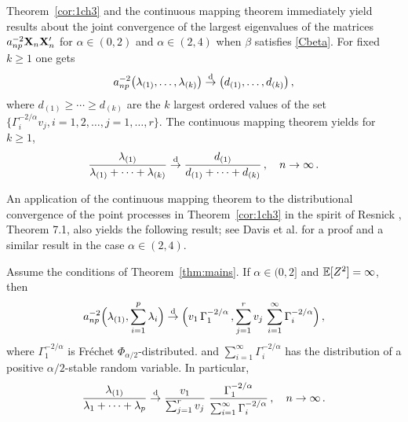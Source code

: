 \par
Theorem~\ref{cor:1ch3} and the continuous mapping theorem immediately yield results about
the joint convergence of the largest eigenvalues of the matrices $a_{np}^{-2}{\mathbf X}_n{\mathbf X}_n'$ for $\alpha\in (0,2)$ and
$\alpha\in (2,4)$ when $\beta$ satisfies \ref{Cbeta}.
For fixed $k\ge 1$ one gets
\begin{equation*}
a_{np}^{-2} \big(\lambda_{(1)},\ldots,\lambda_{(k)}\big)\stackrel{\rm d}{\rightarrow}
\big(d_{(1)},\ldots, d_{(k)}\big)\,,
\end{equation*}
where $d_{(1)}\ge \cdots\ge d_{(k)}$ are the $k$ largest ordered
values of the set $\{\Gamma_i^{-2/\alpha} v_j, i=1,2,\ldots,j=1,\ldots,r\}$.
The continuous mapping theorem yields for $k\ge 1$,
\begin{equation}\label{eq:u}
\dfrac{\lambda_{(1)}}{\lambda_{(1)}+\cdots+ \lambda_{(k)}}\stackrel{\rm d}{\rightarrow}
\dfrac{d_{(1)}}{d_{(1)}+\cdots+ d_{(k)}}\,,\quad n \to \infty\,.
\end{equation}

An application of the continuous mapping theorem to  the distributional convergence of the point processes in Theorem~\ref{cor:1ch3} in the spirit of Resnick
\cite{resnick:2007}, Theorem 7.1, also yields the following result; see Davis et al. \cite{davis:mikosch:pfaffel:2015} for a proof and a similar result in the case $\alpha \in (2,4)$.
\begin{corollary}\label{cor:1q} Assume the conditions of Theorem~\ref{thm:mains}.
If $\alpha \in (0,2]$ and $\mathbb{E}[Z^2]=\infty$, then
\begin{equation*}
a_{np}^{-2}\Big(\lambda_{(1)},\sum_{i=1}^p \lambda_i\Big) \stackrel{\rm d}{\rightarrow}
\Big( v_1\,\Gamma_1^{-2/\alpha}\,,\sum_{j=1}^r v_j\,\sum_{i=1}^\infty \Gamma_i^{-2/\alpha}\Big)\,,
\end{equation*}
where $\Gamma_1^{-2/\alpha}$ is Fr\'echet $\Phi_{\alpha/2}$-distributed.
and $\sum_{i=1}^\infty \Gamma_i^{-2/\alpha}$ has the distribution
of a positive $\alpha/2$-stable random variable.
In particular,
\begin{equation}\label{eq:limit}
\dfrac{\lambda_{(1)}}{\lambda_{1}+\cdots+ \lambda_{p}}\stackrel{\rm d}{\rightarrow}
\dfrac{v_1}{\sum_{j=1}^r v_j}\;
\dfrac{\Gamma_1^{-2/\alpha}}{\sum_{i=1}^\infty\Gamma_i^{-2/\alpha}}\,,\quad
n \to \infty\,.
\end{equation}
\end{corollary}

